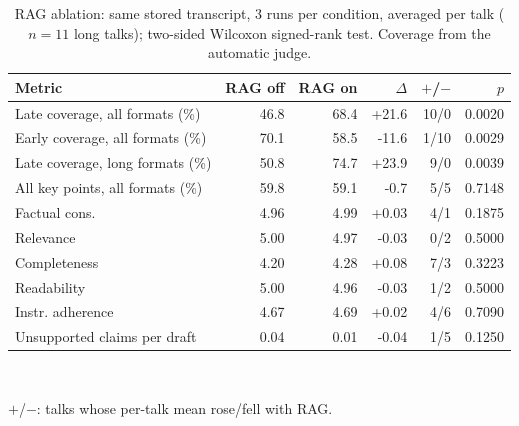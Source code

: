 \begin{table}[t]
\centering
\caption{RAG ablation: same stored transcript, 3 runs per condition, averaged per talk ($n=11$ long talks); two-sided Wilcoxon signed-rank test. Coverage from the automatic judge.}
\label{tab:rag}
\footnotesize
\setlength{\tabcolsep}{2.2pt}
\begin{tabular}{lrrrrr}
\toprule
Metric & RAG off & RAG on & $\Delta$ & $+$/$-$ & $p$ \\
\midrule
Late coverage, all formats (\%) & 46.8 & 68.4 & +21.6 & 10/0 & 0.0020 \\
Early coverage, all formats (\%) & 70.1 & 58.5 & -11.6 & 1/10 & 0.0029 \\
Late coverage, long formats (\%) & 50.8 & 74.7 & +23.9 & 9/0 & 0.0039 \\
All key points, all formats (\%) & 59.8 & 59.1 & -0.7 & 5/5 & 0.7148 \\
\midrule
Factual cons. & 4.96 & 4.99 & +0.03 & 4/1 & 0.1875 \\
Relevance & 5.00 & 4.97 & -0.03 & 0/2 & 0.5000 \\
Completeness & 4.20 & 4.28 & +0.08 & 7/3 & 0.3223 \\
Readability & 5.00 & 4.96 & -0.03 & 1/2 & 0.5000 \\
Instr. adherence & 4.67 & 4.69 & +0.02 & 4/6 & 0.7090 \\
Unsupported claims per draft & 0.04 & 0.01 & -0.04 & 1/5 & 0.1250 \\
\bottomrule
\end{tabular}
\\[2pt]\parbox{\linewidth}{\scriptsize $+$/$-$: talks whose per-talk mean rose/fell with RAG.}
\end{table}
